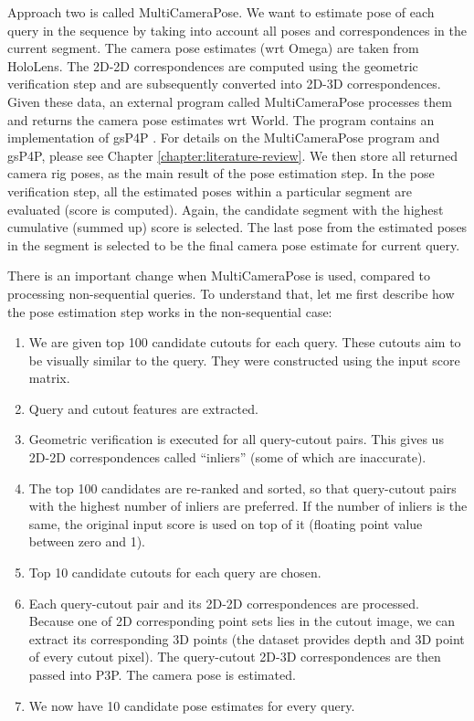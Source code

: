 \documentclass[twoside]{ctuthesis}
\theoremstyle{plain}
\theoremstyle{definition}
\theoremstyle{note}
\newcommand{\code}[1]{{\ttfamily #1%
}}
\newcommand{\topRetrieval}{100} %
\newcommand{\topGV}{10} %
\newcommand{\topPE}{10} %
\begin{document}
Approach two is called MultiCameraPose. We want to estimate pose of each query in the sequence by taking into account all poses and correspondences in the current segment. The camera pose estimates (wrt Omega) are taken from HoloLens. The 2D-2D correspondences are computed using the geometric verification step and are subsequently converted into 2D-3D correspondences. Given these data, an external program called \code{MultiCameraPose} \cite{MultiCameraPose} processes them and returns the camera pose estimates wrt World. The program contains an implementation of gsP4P \cite{Kukelova2016CVPR}. For details on the \code{MultiCameraPose} program and gsP4P, please see Chapter \ref{chapter:literature-review}. We then store all returned camera rig poses, as the main result of the pose estimation step. In the pose verification step, all the estimated poses within a particular segment are evaluated (score is computed). Again, the candidate segment with the highest cumulative (summed up) score is selected. The last pose from the estimated poses in the segment is selected to be the final camera pose estimate for current query.

There is an important change when MultiCameraPose is used, compared to processing non-sequential queries. To understand that, let me first describe how the pose estimation step works in the non-sequential case:

\begin{enumerate}
	\item We are given top \topRetrieval{} candidate cutouts for each query. These cutouts aim to be visually similar to the query. They were constructed using the input \code{score} matrix.
	\item Query and cutout features are extracted.
	\item Geometric verification is executed for all query-cutout pairs. This gives us 2D-2D correspondences called ``inliers'' (some of which are inaccurate).
	\item \label{item:GV-reranking} The top \topRetrieval{} candidates are re-ranked and sorted, so that query-cutout pairs with the highest number of inliers are preferred. If the number of inliers is the same, the original input \code{score} is used on top of it (floating point value between zero and 1).
	\item \label{item:topGV} Top \topGV{} candidate cutouts for each query are chosen.
	\item Each query-cutout pair and its 2D-2D correspondences are processed. Because one of 2D corresponding point sets lies in the cutout image, we can extract its corresponding 3D points (the dataset provides depth and 3D point of every cutout pixel). The query-cutout 2D-3D correspondences are then passed into P3P. The camera pose is estimated.
	\item We now have \topPE{} candidate pose estimates for every query.
\end{enumerate}
\end{document}
